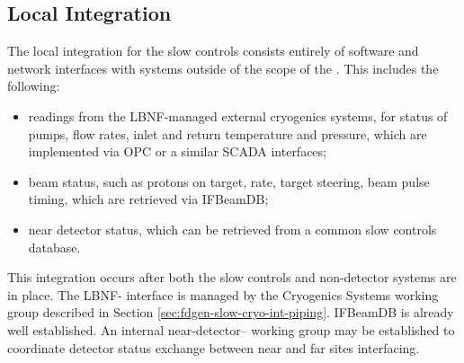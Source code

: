 \subsection{Local Integration}
\label{sec:fdgen-slow-cryo-slow-loc-integ}


The local integration for the slow controls consists entirely of software
and network interfaces with systems outside of the scope of the .
This includes the following:
\begin{itemize}
\item readings from the LBNF-managed external cryogenics systems, for status of pumps, flow rates, inlet and return temperature and pressure, which are implemented via OPC or a similar SCADA interfaces;
\item beam status, such as protons on target, rate, target steering, beam pulse timing, which are retrieved via IFBeamDB;
\item near detector status, which can be retrieved from a common slow controls database.
\end{itemize}

This integration occurs after both the slow controls and non-detector
systems are in place.  The LBNF- interface is managed by the
Cryogenics Systems working group described in Section
\ref{sec:fdgen-slow-cryo-int-piping}.  IFBeamDB is already well established.
An internal near-detector-- working group may be established
to coordinate detector status exchange between near and far sites interfacing.



%
%  
%  

%
%  

